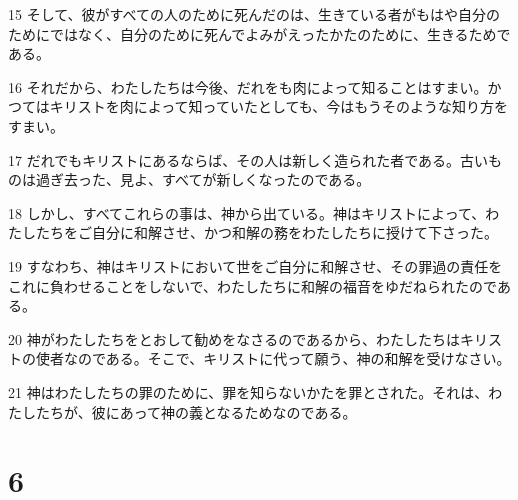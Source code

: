 \par 15 そして、彼がすべての人のために死んだのは、生きている者がもはや自分のためにではなく、自分のために死んでよみがえったかたのために、生きるためである。
\par 16 それだから、わたしたちは今後、だれをも肉によって知ることはすまい。かつてはキリストを肉によって知っていたとしても、今はもうそのような知り方をすまい。
\par 17 だれでもキリストにあるならば、その人は新しく造られた者である。古いものは過ぎ去った、見よ、すべてが新しくなったのである。
\par 18 しかし、すべてこれらの事は、神から出ている。神はキリストによって、わたしたちをご自分に和解させ、かつ和解の務をわたしたちに授けて下さった。
\par 19 すなわち、神はキリストにおいて世をご自分に和解させ、その罪過の責任をこれに負わせることをしないで、わたしたちに和解の福音をゆだねられたのである。
\par 20 神がわたしたちをとおして勧めをなさるのであるから、わたしたちはキリストの使者なのである。そこで、キリストに代って願う、神の和解を受けなさい。
\par 21 神はわたしたちの罪のために、罪を知らないかたを罪とされた。それは、わたしたちが、彼にあって神の義となるためなのである。

\chapter{6}

